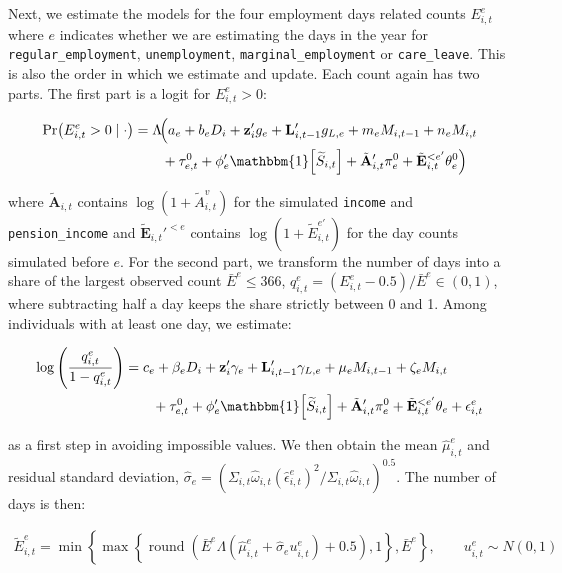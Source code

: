 \documentclass[a4paper,12pt]{article}
\theoremstyle{plain}
\theoremstyle{definition}
\theoremstyle{TheoremNum}
\theoremstyle{CorollaryNum}
\theoremstyle{PropositionNum}
\theoremstyle{TheoremNum}
\begin{document}
Next, we estimate the models for the four employment days related counts $E_{i,t}^e$ where $e$ indicates whether we are estimating the days in the year for \texttt{regular\_employment}, \texttt{unemployment}, \texttt{marginal\_employment} or \texttt{care\_leave}. This is also the order in which we estimate and update. Each count again has two parts. The first part is a logit for $E_{i,t}^e > 0$:

\begin{align*}
\Pr\!\left(E_{i,t}^e>0 \mid \cdot\right)
&=
\Lambda\!\Big(
    a_e
    + b_e D_i
    + \mathbf{z}_i' g_e
    + \mathbf{L}_{i,t-1}'g_{L,e}
    + m_e M_{i,t-1}
    + n_e M_{i,t} \\
&\qquad
    + \tau_{e,t}^0
    + \phi_e' \mathbbm{1}\!\left[\widetilde{S}_{i,t}\right]
    + \tilde{\mathbf{A}}_{i,t}' \pi_e^0 + \tilde{\mathbf{E}}_{i,t}^{<e'} \theta_e^0
\Big)
\end{align*}

where $\tilde{\mathbf{A}}_{i,t}$ contains $\log(1+\tilde{A}_{i,t}^v)$ for the simulated \texttt{income} and \texttt{pension\_income} and $\tilde{\mathbf{E}}_{i,t}'^{<e}$ contains $\log(1+\tilde{E}_{i,t}^{e'})$ for the day counts simulated before $e$. For the second part, we transform the number of days into a share of the largest observed count $\bar{E}^e \leq 366$, $q_{i,t}^e = (E_{i,t}^e - 0.5)/\bar{E}^e \in (0,1)$, where subtracting half a day keeps the share strictly between 0 and 1. Among individuals with at least one day, we estimate:

\begin{align*}
\log\left(\frac{q_{i,t}^e}{1-q_{i,t}^e}\right) & =
c_e + \beta_e D_i + \mathbf{z}_i' \gamma_e + \mathbf{L}_{i,t-1}'\gamma_{L,e} + \mu_e M_{i,t-1} + \zeta_e M_{i,t} \\
&\qquad
+ \tau_{e,t}^0 + \phi_e' \mathbbm{1}\!\left[\widetilde{S}_{i,t}\right] + \tilde{\mathbf{A}}_{i,t}' \pi_e^0 + \tilde{\mathbf{E}}_{i,t}^{<e'} \theta_e + \epsilon_{i,t}^e
\end{align*}

as a first step in avoiding impossible values. We then obtain the mean $\hat{\mu}_{i,t}^e$ and residual standard deviation, $\hat{\sigma}_e = \left(\Sigma_{i,t} \hat{\omega}_{i,t}(\hat{\epsilon}_{i,t}^e)^2 / \Sigma_{i,t} \hat{\omega}_{i,t}\right)^{0.5}$. The number of days is then:

\begin{align*}
\tilde{E}_{i,t}^e = \min \left\{ \max \left\{ \operatorname{round} \left(\bar{E}^e \Lambda \left(\hat{\mu}_{i,t}^e + \hat{\sigma}_{e} u_{i,t}^e \right) + 0.5\right), 1\right\}, \bar{E}^e\right\}, \qquad u_{i,t}^e \sim N(0,1)
\end{align*}
\end{document}
